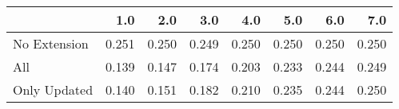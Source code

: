 \begin{tabular}{lrrrrrrr}
\toprule
{} &   1.0 &   2.0 &   3.0 &   4.0 &   5.0 &   6.0 &   7.0 \\
\midrule
No Extension & 0.251 & 0.250 & 0.249 & 0.250 & 0.250 & 0.250 & 0.250 \\
All          & 0.139 & 0.147 & 0.174 & 0.203 & 0.233 & 0.244 & 0.249 \\
Only Updated & 0.140 & 0.151 & 0.182 & 0.210 & 0.235 & 0.244 & 0.250 \\
\bottomrule
\end{tabular}
